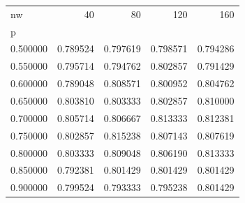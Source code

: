 \begin{tabular}{lrrrr}
\toprule
nw & 40 & 80 & 120 & 160 \\
p &  &  &  &  \\
\midrule
0.500000 & 0.789524 & 0.797619 & 0.798571 & 0.794286 \\
0.550000 & 0.795714 & 0.794762 & 0.802857 & 0.791429 \\
0.600000 & 0.789048 & 0.808571 & 0.800952 & 0.804762 \\
0.650000 & 0.803810 & 0.803333 & 0.802857 & 0.810000 \\
0.700000 & 0.805714 & 0.806667 & 0.813333 & 0.812381 \\
0.750000 & 0.802857 & 0.815238 & 0.807143 & 0.807619 \\
0.800000 & 0.803333 & 0.809048 & 0.806190 & 0.813333 \\
0.850000 & 0.792381 & 0.801429 & 0.801429 & 0.801429 \\
0.900000 & 0.799524 & 0.793333 & 0.795238 & 0.801429 \\
\bottomrule
\end{tabular}
